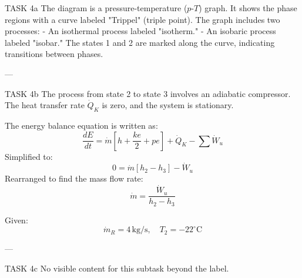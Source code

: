 TASK 4a  
The diagram is a pressure-temperature (\( p \)-\( T \)) graph. It shows the phase regions with a curve labeled "Trippel" (triple point). The graph includes two processes:  
- An isothermal process labeled "isotherm."  
- An isobaric process labeled "isobar."  
The states 1 and 2 are marked along the curve, indicating transitions between phases.

---

TASK 4b  
The process from state 2 to state 3 involves an adiabatic compressor. The heat transfer rate \( \dot{Q}_K \) is zero, and the system is stationary.  

The energy balance equation is written as:  
\[
\frac{dE}{dt} = \dot{m} \left[ h + \frac{k e}{2} + p e \right] + \dot{Q}_K - \sum \dot{W}_u
\]  
Simplified to:  
\[
0 = \dot{m} \left[ h_2 - h_3 \right] - \dot{W}_u
\]  
Rearranged to find the mass flow rate:  
\[
\dot{m} = \frac{\dot{W}_u}{h_2 - h_3}
\]  

Given:  
\[
\dot{m}_R = 4 \, \text{kg/s}, \quad T_2 = -22^\circ\text{C}
\]  

---

TASK 4c  
No visible content for this subtask beyond the label.